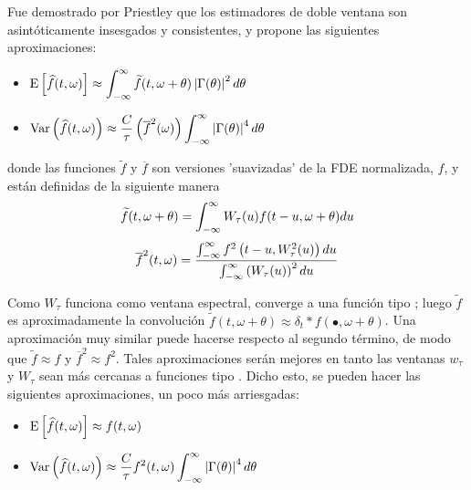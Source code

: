 Fue demostrado por Priestley \cite{Priestley65} que los estimadores de doble ventana son 
asintóticamente insesgados y consistentes, y propone las siguientes aproximaciones:
\begin{itemize}
\item $\displaystyle
\mathrm{E}\left[ \widehat{ f }(t,\omega) \right] \approx 
\int_{-\infty}^{\infty} \widetilde{f}(t,\omega+\theta) \left| \Gamma(\theta) \right|^{2} d\theta$
\item $\displaystyle
\mathrm{Var}\left( \widehat{ f }(t,\omega) \right) \approx \frac{C}{\tau} \left( \overline{f}^{2}(\omega) \right)
\int_{-\infty}^{\infty} \left| \Gamma(\theta) \right|^{4} d\theta $
\end{itemize}

donde las funciones $\widetilde{f}$ y $\overline{f}$ son versiones 'suavizadas' de la FDE 
normalizada, $f$, y están definidas de la siguiente manera
\begin{equation*}
\widetilde{f}(t,\omega+\theta) = 
\int_{-\infty}^{\infty} W_{\tau}(u) f(t-u,\omega+\theta) du
\end{equation*}
\begin{equation*}
\overline{f}^{2} (t,\omega) =
\frac{\int_{-\infty}^{\infty} f^{2}\left(t-u,W_{\tau}^{2}(u)\right) du}
{\int_{-\infty}^{\infty} \left( W_{\tau}(u) \right)^{2} du}
\end{equation*}

Como $W_{\tau}$ funciona como ventana espectral, converge a una 
función tipo \dirac; luego $\widetilde{f}$ es aproximadamente la convolución 
$\widetilde{f}(t,\omega+\theta) \approx \delta_t \ast f(\bullet,\omega+\theta)$. 
Una aproximación muy similar 
puede hacerse respecto al segundo término, de modo que $\widetilde{f}\approx f$ y 
$\overline{f}^{2}\approx f^{2}$.
Tales aproximaciones serán mejores en tanto las ventanas $w_{\tau}$ y $W_{\tau}$ sean más 
cercanas a funciones tipo \dirac.
Dicho esto, se pueden hacer las siguientes aproximaciones, un poco más arriesgadas:
\begin{itemize}
\item $\displaystyle \mathrm{E}\left[ \widehat{ f }(t,\omega) \right] \approx f(t,\omega)$
\item $\displaystyle \mathrm{Var}\left( \widehat{ f }(t,\omega) \right) \approx 
\frac{C}{\tau} f^{2}(t,\omega) \int_{-\infty}^{\infty} \left| \Gamma (\theta) \right|^{4} d\theta$
\end{itemize}


